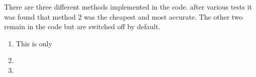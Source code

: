 There are three different methods implemented in the code.
after various tests it was found that method 2 was the 
cheapest and most accurate. The other two remain in the code
but are switched off by default.

\begin{enumerate}
\item This is only
\item 
\item
\end{enumerate}

